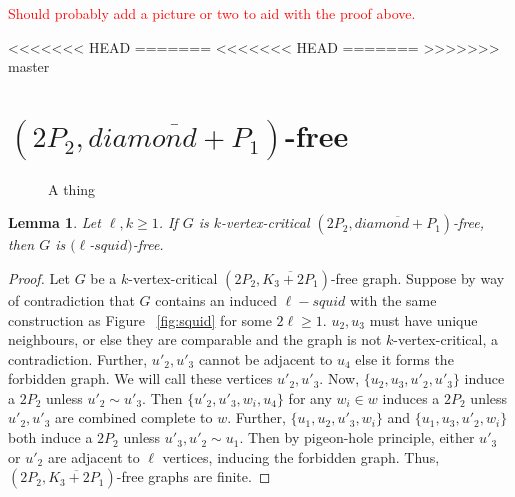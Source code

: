 \documentclass[11pt]{article}
\newtheorem{lemma}[theorem]{Lemma}
\theoremstyle{definition}
\begin{document}
\textcolor{red}{Should probably add a picture or two to aid with the proof above.}

<<<<<<< HEAD
=======
<<<<<<< HEAD
=======
>>>>>>> master
\section{$(2P_2, \overline{diamond + P_1})$-free}

\begin{figure}[h]
\def\r{1.5}
\centering
{}
\caption{A thing}
\end{figure}

\begin{lemma}\label{lem:compdiamondplusP1}
Let $\ell,k\ge 1$. If $G$ is $k$-vertex-critical $(2P_2, \overline{diamond+P_1})$-free, then $G$ is $(\ell$-$squid)$-free.
\end{lemma}
\begin{proof}
Let $G$ be a $k$-vertex-critical $(2P_2, \overline{K_3 + 2P_1})$-free graph. Suppose by way of contradiction that $G$ contains an induced $\ell-squid$ with the same construction as Figure ~\ref{fig:squid} for some $2\ell \geq 1$.
$u_2, u_3$ must have unique neighbours, or else they are comparable and the graph is not $k$-vertex-critical, a contradiction. Further, $u'_2, u'_3$ cannot be adjacent to $u_4$ else it forms the forbidden graph. We will call these vertices $u'_2, u'_3$. Now, $\{ u_2, u_3, u'_2, u'_3 \}$ induce a $2P_2$ unless $u'_2 \sim u'_3$. Then $\{ u'_2, u'_3, w_i, u_4 \}$ for any $w_i \in w$ induces a $2P_2$ unless $u'_2, u'_3$ are combined complete to $w$. Further, $\{ u_1, u_2, u'_3, w_i \}$ and $\{ u_1, u_3, u'_2, w_i \}$ both induce a $2P_2$ unless $u'_3, u'_2 \sim u_1$. Then by pigeon-hole principle, either $u'_3$ or $u'_2$ are adjacent to $\ell$ vertices, inducing the forbidden graph. Thus, $(2P_2, \overline{K_3 + 2P_1})$-free graphs are finite.
\end{proof}
\end{document}
